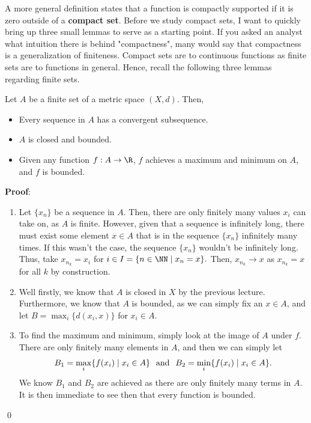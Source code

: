 A more general definition states that a function is compactly supported if it is zero outside of a \textbf{compact set}. Before we study compact sets, I want to quickly bring up three small lemmas to serve as a starting point. If you asked an analyst what intuition there is behind "compactness", many would say that compactness is a generalization of finiteness. Compact sets are to continuous functions as finite sets are to functions in general. Hence, recall the following three lemmas regarding finite sets.
\begin{recall}
Let $A$ be a finite set of a metric space $(X,d)$. Then, 
\begin{itemize}
    \item Every sequence in $A$ has a convergent subsequence.
    \item $A$ is closed and bounded.
    \item Given any function $f:A\to \R$, $f$ achieves a maximum and minimum on $A$, and $f$ is bounded.
\end{itemize}
\end{recall}
\textbf{Proof}:
\begin{enumerate}
    \item Let $\{x_n\}$ be a sequence in $A$. Then, there are only finitely many values $x_i$ can take on, as $A$ is finite. However, given that a sequence is infinitely long, there must exist some element $x\in A$ that is in the sequence $\{x_n\}$ infinitely many times. If this wasn't the case, the sequence $\{x_n\}$ wouldn't be infinitely long. Thus, take $x_{n_k} = x_i$ for $i\in I = \{n\in \NN \mid x_n = x\}.$ Then, $x_{n_k} \to x$ as $x_{n_k} = x$ for all $k$ by construction.
    \item Well firstly, we know that $A$ is closed in $X$ by the previous lecture. Furthermore, we know that $A$ is bounded, as we can simply fix an $x\in A$, and let $B = \max_i \{d(x_i,x)\}$ for $x_i \in A$.
    
    \item To find the maximum and minimum, simply look at the image of $A$ under $f$. There are only finitely many elements in $A$, and then we can simply let 
    \[
    B_1 = \max_{i} \{f(x_i)\mid x_i \in A\} \hspace{.25cm} \text{and} \hspace{.25 cm} B_2 = \min_{i} \{f(x_i)\mid x_i \in A\}.
    \]
    We know $B_1$ and $B_2$ are achieved as there are only finitely many terms in $A$. It is then immediate to see then that every function is bounded.
\end{enumerate}\qed 

